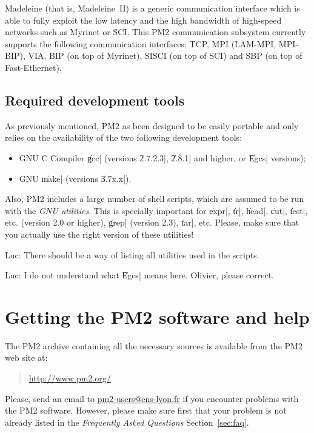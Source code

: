 Madeleine (that is, Madeleine~II) is a generic communication interface
which is able to fully exploit the low latency and the high bandwidth
of high-speed networks such as Myrinet or SCI. This PM2 communication
subsystem currently supports the following communication interfaces:
TCP, MPI (LAM-MPI, MPI-BIP), VIA, BIP (on top of Myrinet), SISCI (on
top of SCI) and SBP (on top of Fast-Ethernet).

\subsection{Required development tools}
\label{sec:tools}

As previously mentioned, PM2 as been designed to be easily portable
and only relies on the availability of the two following development
tools:
\begin{itemize}
  \small
\item GNU C Compiler \|gcc| (versions \|2.7.2.3|, \|2.8.1| and higher,
  or \|Egcs| versions);
\item GNU \|make| (versions \|3.7x.x|).
\end{itemize}
Also, PM2 includes a large number of shell scripts, which are assumed
to be run with the \emph{GNU utilities}. This is specially important
for \|expr|, \|tr|, \|head|, \|cut|, \|test|, etc. (version 2.0 or
higher), \|grep| (version 2.3), \|tar|, etc. Please, make sure that
you actually use the right version of these utilities!
 
\begin{note}
  Luc: There should be a way of listing all utilities used in the
  scripts.
\end{note}

\begin{note}
  Luc: I do not understand what \|Egcs| means here. Olivier, please
  correct.
\end{note}

\section{Getting the PM2 software and help}

The PM2 archive containing all the necessary sources is available
from the PM2 web site at:
\begin{quote}
  \url{http://www.pm2.org/}
\end{quote}

Please, send an email to \url{pm2-users@ens-lyon.fr} if you encounter
problems with the PM2 software. However, please make sure first that
your problem is not already listed in the \emph{Frequently Asked
  Questions} Section~\ref{sec:faq}.

